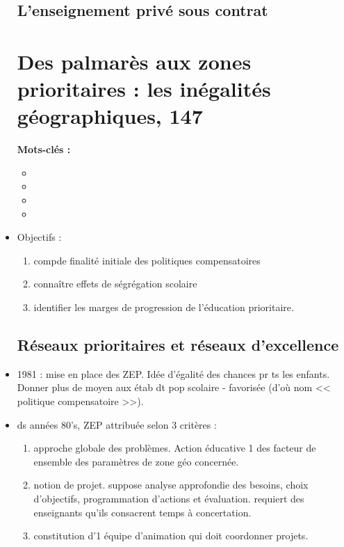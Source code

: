 \documentclass[12pt]{report}
\begin{document}
\begin{itemize}
\section{L'enseignement privé sous contrat}




\chapter{Des palmarès aux zones prioritaires : les inégalités géographiques, 147}


\textbf{Mots-clés : } 

\begin{itemize}
\item 
\item 
\item 
\item  
\end{itemize}

\item Objectifs : 
\begin{enumerate}
\item compde finalité initiale des politiques compensatoires \\
\item connaître effets de ségrégation scolaire
\item identifier les marges de progression de l'éducation prioritaire.
\end{enumerate}

\section{Réseaux prioritaires et réseaux d'excellence}


\item 1981 : mise en place des ZEP. Idée d'égalité des chances pr ts les enfants. Donner plus de moyen aux étab dt pop scolaire - favorisée (d'où nom << politique compensatoire >>).

\item ds années 80's, ZEP attribuée selon 3 critères : 
\begin{enumerate}
\item approche globale des problèmes. Action éducative 1 des facteur de ensemble des paramètres de zone géo concernée.  \\
\item notion de projet. suppose analyse approfondie des besoins, choix d'objectifs, programmation d'actions et évaluation. requiert des enseignants qu'ils consacrent temps à concertation. \\
\item constitution d'1 équipe d'animation qui doit coordonner projets.


\end{enumerate}
\end{itemize}
\end{document}
